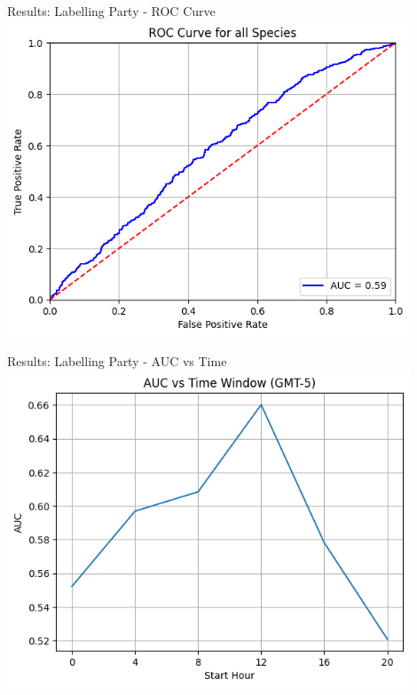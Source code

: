 \begin{frame}{Results: Labelling Party - ROC Curve}
    \centering
    \includegraphics[height=0.9\textheight,width=0.9\textwidth,keepaspectratio]{images/ROC_Curve_original_grid.png}
\end{frame}

\begin{frame}{Results: Labelling Party - AUC vs Time}
    \centering
    \includegraphics[height=0.9\textheight,width=0.9\textwidth,keepaspectratio]{images/AUC.png}
\end{frame}

